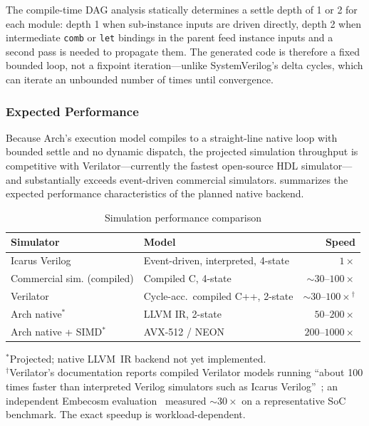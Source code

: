 \documentclass[11pt,twocolumn]{article}
\begin{document}
The compile-time DAG analysis statically determines a settle depth of 1 or 2 for each module: depth 1 when sub-instance inputs are driven directly, depth 2 when intermediate \texttt{comb} or \texttt{let} bindings in the parent feed instance inputs and a second pass is needed to propagate them. The generated code is therefore a fixed bounded loop, not a fixpoint iteration---unlike SystemVerilog's delta cycles, which can iterate an unbounded number of times until convergence.

\subsubsection{Expected Performance}

Because Arch's execution model compiles to a straight-line native loop with bounded settle and no dynamic dispatch, the projected simulation throughput is competitive with Verilator---currently the fastest open-source HDL simulator---and substantially exceeds event-driven commercial simulators.  summarizes the expected performance characteristics of the planned native backend.

\begin{table}[!t]
\centering
\caption{Simulation performance comparison}
\label{tab:perf}
\footnotesize
\begin{tabular}{@{}llr@{}}
\toprule
\textbf{Simulator} & \textbf{Model} & \textbf{Speed} \\
\midrule
Icarus Verilog~\cite{icarus} & Event-driven, interpreted, 4-state & $1\times$ \\
Commercial sim. (compiled) & Compiled C, 4-state & ${\sim}30$--$100\times$ \\
Verilator~\cite{verilator} & Cycle-acc.\ compiled C++, 2-state & ${\sim}30$--$100\times$$^\dagger$ \\
Arch native$^\ast$ & LLVM IR, 2-state & $50$--$200\times$ \\
Arch native + SIMD$^\ast$ & AVX-512 / NEON & $200$--$1000\times$ \\
\bottomrule
\end{tabular}

\vspace{0.4em}
\raggedright\footnotesize
$^\ast$Projected; native LLVM~IR backend not yet implemented.\\
$^\dagger$Verilator's documentation reports compiled Verilator models running ``about 100 times faster than interpreted Verilog simulators such as Icarus Verilog''~\cite{verilator}; an independent Embecosm evaluation~\cite{embecosm2013} measured ${\sim}30\times$ on a representative SoC benchmark. The exact speedup is workload-dependent.
\end{table}
\end{document}
